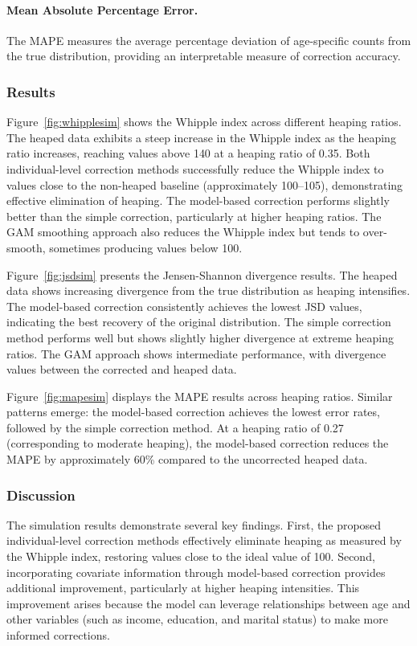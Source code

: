 \documentclass[pdflatex,sn-mathphys-num]{sn-jnl}%
\theoremstyle{thmstyleone}%
\theoremstyle{thmstyletwo}%
\theoremstyle{thmstylethree}%
\begin{document}
\paragraph{Mean Absolute Percentage Error.} The MAPE measures the average percentage deviation of age-specific counts from the true distribution, providing an interpretable measure of correction accuracy.

\subsubsection{Results}

Figure~\ref{fig:whipplesim} shows the Whipple index across different heaping ratios. The heaped data exhibits a steep increase in the Whipple index as the heaping ratio increases, reaching values above 140 at a heaping ratio of 0.35. Both individual-level correction methods successfully reduce the Whipple index to values close to the non-heaped baseline (approximately 100--105), demonstrating effective elimination of heaping. The model-based correction performs slightly better than the simple correction, particularly at higher heaping ratios. The GAM smoothing approach also reduces the Whipple index but tends to over-smooth, sometimes producing values below 100.

Figure~\ref{fig:jsdsim} presents the Jensen-Shannon divergence results. The heaped data shows increasing divergence from the true distribution as heaping intensifies. The model-based correction consistently achieves the lowest JSD values, indicating the best recovery of the original distribution. The simple correction method performs well but shows slightly higher divergence at extreme heaping ratios. The GAM approach shows intermediate performance, with divergence values between the corrected and heaped data.

Figure~\ref{fig:mapesim} displays the MAPE results across heaping ratios. Similar patterns emerge: the model-based correction achieves the lowest error rates, followed by the simple correction method. At a heaping ratio of 0.27 (corresponding to moderate heaping), the model-based correction reduces the MAPE by approximately 60\% compared to the uncorrected heaped data.

\subsubsection{Discussion}

The simulation results demonstrate several key findings. First, the proposed individual-level correction methods effectively eliminate heaping as measured by the Whipple index, restoring values close to the ideal value of 100. Second, incorporating covariate information through model-based correction provides additional improvement, particularly at higher heaping intensities. This improvement arises because the model can leverage relationships between age and other variables (such as income, education, and marital status) to make more informed corrections.
\end{document}
